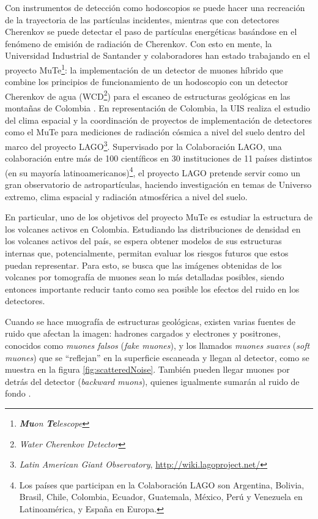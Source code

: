 \documentclass[12pt]{report}
\begin{document}
Con instrumentos de detección como hodoscopios se puede hacer una recreación de la trayectoria de las partículas incidentes, mientras que con detectores Cherenkov se puede detectar el paso de partículas energéticas basándose en el fenómeno de emisión de radiación de Cherenkov. Con esto en mente, la Universidad Industrial de Santander y colaboradores han estado trabajando en el proyecto MuTe\footnote{\textit{\textbf{Mu}on \textbf{Te}lescope}}: la implementación de un detector de muones híbrido que combine los principios de funcionamiento de un hodoscopio con un detector Cherenkov de agua (WCD\footnote{\textit{Water Cherenkov Detector}}) para el escaneo de estructuras geológicas en las montañas de Colombia \cite{rodriguez2018minimute}. En representación de Colombia, la UIS realiza el estudio del clima espacial y la coordinación de proyectos de implementación de detectores como el MuTe para mediciones de radiación cósmica a nivel del suelo dentro del marco del proyecto LAGO\footnote{\textit{Latin American Giant Observatory}, \url{http://wiki.lagoproject.net/}}. Supervisado por la Colaboración LAGO, una colaboración entre más de 100 científicos en 30 instituciones de 11 países distintos (en su mayoría latinoamericanos)\footnote{Los países que participan en la Colaboración LAGO son Argentina, Bolivia, Brasil, Chile, Colombia, Ecuador, Guatemala, México, Perú y Venezuela en Latinoamérica, y España en Europa.}, el proyecto LAGO pretende servir como un gran observatorio de astropartículas, haciendo investigación en temas de Universo extremo, clima espacial y radiación atmosférica a nivel del suelo.

En particular, uno de los objetivos del proyecto MuTe es estudiar la estructura de los volcanes activos en Colombia. Estudiando las distribuciones de densidad en los volcanes activos del país, se espera obtener modelos de sus estructuras internas que, potencialmente, permitan evaluar los riesgos futuros que estos puedan representar. Para esto, se busca que las imágenes obtenidas de los volcanes por tomografía de muones sean lo más detalladas posibles, siendo entonces importante reducir tanto como sea posible los efectos del ruido en los detectores.

Cuando se hace muografía de estructuras geológicas, existen varias fuentes de ruido que afectan la imagen: hadrones cargados y electrones y positrones, conocidos como \textit{muones falsos} (\textit{fake muones}), y los llamados \textit{muones suaves} (\textit{soft muones}) que se ``reflejan'' en la superficie escaneada y llegan al detector, como se muestra en la figura \ref{fig:scatteredNoise}. También pueden llegar muones por detrás del detector (\textit{backward muons}), quienes igualmente sumarán al ruido de fondo \cite{bonechi2020atmospheric}.
\end{document}
